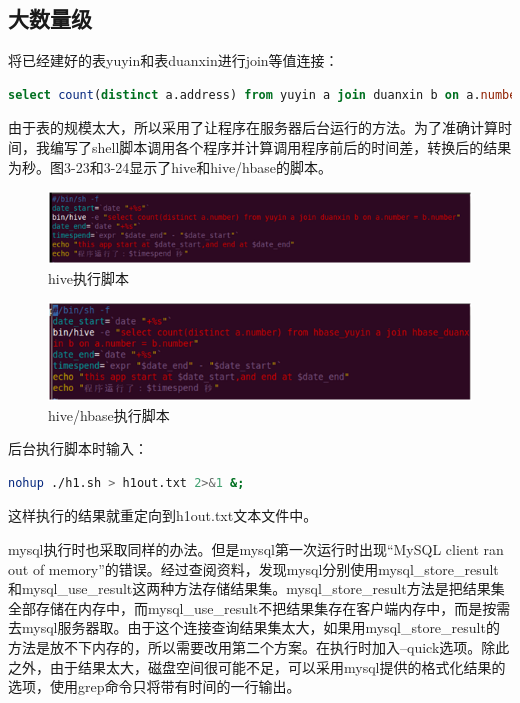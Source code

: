 \subsection{大数量级}

将已经建好的表yuyin和表duanxin进行join等值连接：
\begin{lstlisting}[language=SQL]
select count(distinct a.address) from yuyin a join duanxin b on a.number=b.number;
\end{lstlisting}

由于表的规模太大，所以采用了让程序在服务器后台运行的方法。为了准确计算时间，我编写了shell脚本调用各个程序并计算调用程序前后的时间差，转换后的结果为秒。图3-23和3-24显示了hive和hive/hbase的脚本。

\begin{figure}[!ht]
\centering
\includegraphics[]{photo/jb1.png} 
\caption{hive执行脚本}
\end{figure} 

\begin{figure}[!ht]
\centering
\includegraphics[]{photo/jb3.png} 
\caption{hive/hbase执行脚本}
\end{figure} 

后台执行脚本时输入：
\begin{lstlisting}[language=sh]
nohup ./h1.sh > h1out.txt 2>&1 &;
\end{lstlisting}
这样执行的结果就重定向到h1out.txt文本文件中。

mysql执行时也采取同样的办法。但是mysql第一次运行时出现“MySQL client ran out of memory”的错误。经过查阅资料，发现mysql分别使用mysql\_store\_result和mysql\_use\_result这两种方法存储结果集。mysql\_store\_result方法是把结果集全部存储在内存中，而mysql\_use\_result不把结果集存在客户端内存中，而是按需去mysql服务器取。由于这个连接查询结果集太大，如果用mysql\_store\_result的方法是放不下内存的，所以需要改用第二个方案。在执行时加入--quick选项。除此之外，由于结果太大，磁盘空间很可能不足，可以采用mysql提供的格式化结果的选项，使用grep命令只将带有时间的一行输出。

